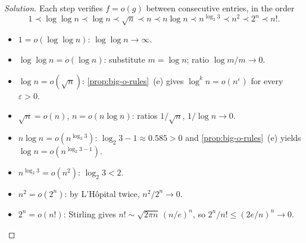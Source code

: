 \begin{proof}[Solution]
Each step verifies $f = o(g)$ between consecutive entries, in the
order
\[
  1 \prec \log\log n \prec \log n \prec \sqrt n \prec n \prec n \log n
    \prec n^{\log_2 3} \prec n^2 \prec 2^n \prec n!.
\]
\begin{itemize}
  \item $1 = o(\log\log n)$: $\log\log n \to \infty$.
  \item $\log\log n = o(\log n)$: substitute $m = \log n$; ratio
        $\log m / m \to 0$.
  \item $\log n = o(\sqrt n)$: \cref{prop:big-o-rules}~(e) gives
        $\log^k n = o(n^\varepsilon)$ for every $\varepsilon > 0$.
  \item $\sqrt n = o(n)$, $n = o(n \log n)$: ratios $1/\sqrt n$,
        $1/\log n \to 0$.
  \item $n \log n = o(n^{\log_2 3})$: $\log_2 3 - 1 \approx 0.585 > 0$
        and \cref{prop:big-o-rules}~(e) yields
        $\log n = o(n^{\log_2 3 - 1})$.
  \item $n^{\log_2 3} = o(n^2)$: $\log_2 3 < 2$.
  \item $n^2 = o(2^n)$: by L'Hôpital twice, $n^2 / 2^n \to 0$.
  \item $2^n = o(n!)$: Stirling gives $n! \sim \sqrt{2\pi n}\,(n/e)^n$,
        so $2^n / n! \le (2 e / n)^n \to 0$.
\end{itemize}
\end{proof}

